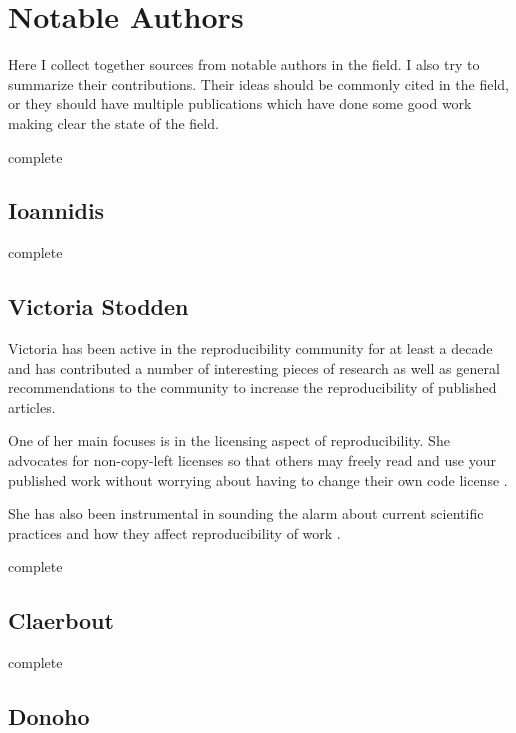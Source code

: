 \documentclass[american]{article}
\newcommand{\complete}{
	\gls{complete}
}
\begin{document}
\section{Notable Authors} \label{sec:authors}

Here I collect together sources from notable authors in the field. I also try to summarize their contributions. Their ideas should be commonly cited in the field, or they should have multiple publications which have done some good work making clear the state of the field.

\complete

\subsection{Ioannidis} \label{sec:authors-ioannidis}

\complete

\subsection{Victoria Stodden} \label{sec:authors-stodden}

Victoria has been active in the reproducibility community for at least a decade and has contributed a number of interesting pieces of research as well as general recommendations to the community to increase the reproducibility of published articles.

One of her main focuses is in the licensing aspect of reproducibility. She advocates for non-copy-left licenses so that others may freely read and use your published work without worrying about having to change their own code license \cite{stodden-legal-framework-reproducible-2009}.

She has also been instrumental in sounding the alarm about current scientific practices and how they affect reproducibility of work \cite{stodden-reproducibility-crisis}.

\complete

\subsection{Claerbout} \label{sec:authors-claerbout}

\complete

\subsection{Donoho} \label{sec:authors-donoho}
\end{document}
